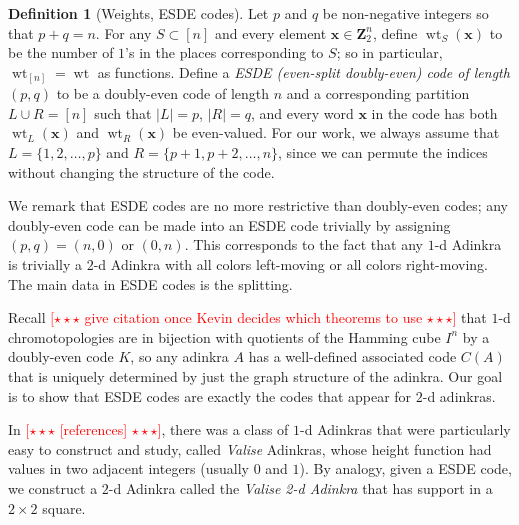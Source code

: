 \documentclass[12pt,twoside,singlespace]{article}
\numberwithin{equation}{section}
\theoremstyle{definition}
\newtheorem{definition}[equation]{Definition}
\newcommand{\ZZ}{\mathbf{Z}}
\newcommand{\on}{\operatorname}
\newcommand{\wt}{\on{wt}}
\newcommand{\com}[1]{\textcolor{red}{$[\star \star \star$ #1 $\star \star \star]$}}
\renewcommand{\vec}[1]{\mathbf{#1}}
\begin{document}
\begin{definition}[Weights, ESDE codes]
Let $p$ and $q$ be non-negative integers so that $p+q=n$. For any $S \subset [n]$ and every element $\vec{x} \in \ZZ_2^n$, define $\wt_S(\vec{x})$ to be the number of $1$'s in the places corresponding to $S$; so in particular, $\wt_{[n]} = \wt$ as functions. Define a \emph{ESDE (even-split doubly-even) code of length $(p,q)$} to be a doubly-even code of length $n$ and a corresponding partition $L \cup R = [n]$ such that $|L| = p$, $|R| = q$, and every word $\vec{x}$ in the code has both $\wt_L(\vec{x})$ and $\wt_R(\vec{x})$ be even-valued. For our work, we always assume that $L = \{1, 2, \ldots, p\}$ and $R = \{p+1, p+2, \ldots, n\}$, since we can permute the indices without changing the structure of the code.


We remark that ESDE codes are no more restrictive than doubly-even codes; any doubly-even code can be made into an ESDE code trivially by assigning $(p,q) = (n, 0)$ or $(0, n)$. This corresponds to the fact that any $1$-d Adinkra is trivially a $2$-d Adinkra with all colors left-moving or all colors right-moving. The main data in ESDE codes is the splitting.
\end{definition}

Recall \com{give citation once Kevin decides which theorems to use} that $1$-d chromotopologies are in bijection with quotients of the Hamming cube $I^n$ by a doubly-even code $K$, so any adinkra $A$ has a well-defined associated code $C(A)$ that is uniquely determined by just the graph structure of the adinkra. Our goal is to show that ESDE codes are exactly the codes that appear for $2$-d adinkras.

In \com{[references]}, there was a class of $1$-d Adinkras that were particularly easy to construct and study, called {\em Valise} Adinkras, whose height function had values in two adjacent integers (usually $0$ and $1$).  By analogy, given a ESDE code, we construct a $2$-d Adinkra called the {\em Valise 2-d Adinkra} that has support in a $2\times 2$ square.
\end{document}
